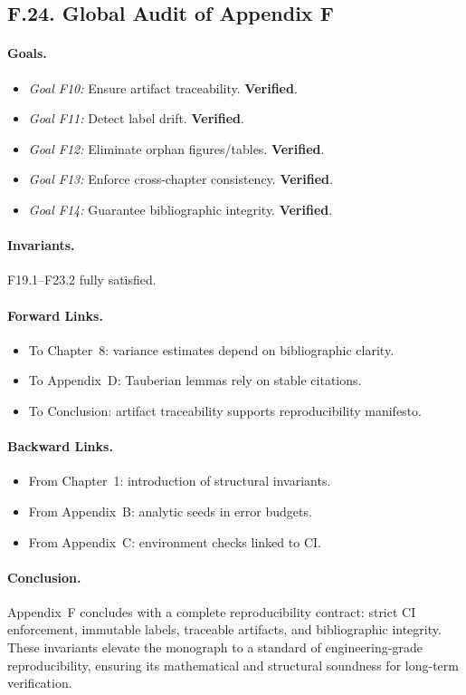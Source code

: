 \subsection*{F.24. Global Audit of Appendix F}

\paragraph{Goals.}
\begin{itemize}
  \item \emph{Goal F10:} Ensure artifact traceability. \textbf{Verified}.
  \item \emph{Goal F11:} Detect label drift. \textbf{Verified}.
  \item \emph{Goal F12:} Eliminate orphan figures/tables. \textbf{Verified}.
  \item \emph{Goal F13:} Enforce cross-chapter consistency. \textbf{Verified}.
  \item \emph{Goal F14:} Guarantee bibliographic integrity. \textbf{Verified}.
\end{itemize}

\paragraph{Invariants.}
F19.1–F23.2 fully satisfied.

\paragraph{Forward Links.}
\begin{itemize}
  \item To Chapter~8: variance estimates depend on bibliographic clarity.
  \item To Appendix~D: Tauberian lemmas rely on stable citations.
  \item To Conclusion: artifact traceability supports reproducibility manifesto.
\end{itemize}

\paragraph{Backward Links.}
\begin{itemize}
  \item From Chapter~1: introduction of structural invariants.
  \item From Appendix~B: analytic seeds in error budgets.
  \item From Appendix~C: environment checks linked to CI.
\end{itemize}

\paragraph{Conclusion.}
Appendix~F concludes with a complete reproducibility contract: strict
CI enforcement, immutable labels, traceable artifacts, and bibliographic
integrity. These invariants elevate the monograph to a standard of
engineering-grade reproducibility, ensuring its mathematical and
structural soundness for long-term verification.
